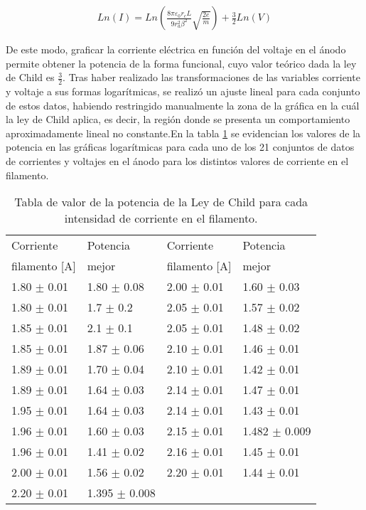 \documentclass[%
 reprint,
 amsmath,amssymb,
 aps,
]{revtex4-2}
\begin{document}
\begin{align*}
    Ln(I) = Ln\left(\frac{8\pi \varepsilon_{0}r_{c}L}{9r_{a}^{2}\beta^{2}} \sqrt{\frac{2e}{m}}\right) + \frac{3}{2}Ln(V)
\end{align*}

\vspace{0.2 cm}
De este modo, graficar la corriente eléctrica en función del voltaje en el ánodo permite obtener la potencia de la forma funcional, cuyo valor teórico dada la ley de Child es $\frac{3}{2}$. Tras haber realizado las transformaciones de las variables corriente y voltaje a sus formas logarítmicas, se realizó un ajuste lineal para cada conjunto de estos datos, habiendo restringido manualmente la zona de la gráfica en la cuál la ley de Child aplica, es decir, la región donde se presenta un comportamiento aproximadamente lineal no constante.En la tabla \ref{tab: Potencias Ley de Child} se evidencian los valores de la potencia en las gráficas logarítmicas para cada uno de los 21 conjuntos de datos de corrientes y voltajes en el ánodo para los distintos valores de corriente en el filamento.

\begin{table}[H]
    \centering
    \begin{tabular}{l|l||l|l}
        \toprule
        \toprule
            Corriente  & Potencia  & Corriente  & Potencia \\
            filamento [A] & mejor& filamento [A] & mejor\\
        \midrule
         1.80 $\pm$ 0.01  &  1.80  $\pm$ 0.08 & 2.00 $\pm$ 0.01  &  1.60  $\pm$  0.03\\
         1.80 $\pm$ 0.01  &  1.7  $\pm$  0.2 & 2.05 $\pm$ 0.01  &  1.57  $\pm$  0.02\\
         1.85 $\pm$ 0.01  &  2.1  $\pm$  0.1 & 2.05 $\pm$ 0.01  &  1.48  $\pm$  0.02\\
         1.85 $\pm$ 0.01  &  1.87  $\pm$  0.06 & 2.10 $\pm$ 0.01  &  1.46  $\pm$  0.01\\
         1.89 $\pm$ 0.01  &  1.70  $\pm$  0.04 & 2.10 $\pm$ 0.01  &  1.42  $\pm$  0.01\\
         1.89 $\pm$ 0.01  &  1.64  $\pm$  0.03 &  2.14 $\pm$ 0.01  &  1.47  $\pm$  0.01\\
         1.95 $\pm$ 0.01  &  1.64  $\pm$  0.03 & 2.14 $\pm$ 0.01  &  1.43  $\pm$  0.01\\
         1.96 $\pm$ 0.01  &  1.60  $\pm$  0.03 & 2.15 $\pm$ 0.01  &  1.482  $\pm$  0.009\\
         1.96 $\pm$ 0.01  &  1.41  $\pm$  0.02 & 2.16 $\pm$ 0.01  &  1.45  $\pm$  0.01\\
         2.00 $\pm$ 0.01  &  1.56  $\pm$  0.02 & 2.20 $\pm$ 0.01  &  1.44  $\pm$  0.01 \\
        2.20 $\pm$ 0.01  &  1.395  $\pm$  0.008 & & \\
    \bottomrule
    \bottomrule
    \end{tabular}
    \caption{Tabla de valor de la potencia de la Ley de Child para cada intensidad de corriente en el filamento.}
    \label{tab: Potencias Ley de Child}
\end{table}
\end{document}
